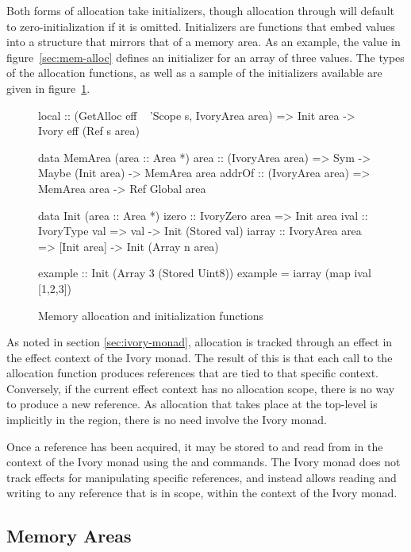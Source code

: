 Both forms of allocation take initializers, though  allocation
through  will default to zero-initialization if it is omitted.
Initializers are functions that embed values into a structure that mirrors that
of a memory area.  As an example, the  value in
figure~\ref{sec:mem-alloc} defines an initializer for an array of three
 values.  The types of the allocation functions, as well as a sample
of the initializers available are given in figure~\ref{fig:mem-alloc}.

\begin{figure}
\begin{code}
local  :: (GetAlloc eff ~ 'Scope s, IvoryArea area)
       => Init area -> Ivory eff (Ref s area)

data MemArea (area :: Area *)
area   :: (IvoryArea area)
       => Sym -> Maybe (Init area) -> MemArea area
addrOf :: (IvoryArea area)
       => MemArea area -> Ref Global area

data Init (area :: Area *)
izero  :: IvoryZero area => Init area
ival   :: IvoryType val  => val -> Init (Stored val)
iarray :: IvoryArea area
       => [Init area] -> Init (Array n area)

example :: Init (Array 3 (Stored Uint8))
example  = iarray (map ival [1,2,3])
\end{code}
\caption{Memory allocation and initialization functions}
\label{fig:mem-alloc}
\end{figure}

As noted in section \ref{sec:ivory-monad}, allocation is tracked through an
effect in the effect context of the Ivory monad.  The result of this is that
each call to the  allocation function produces references that are
tied to that specific context.  Conversely, if the current effect context has
no allocation scope, there is no way to produce a new reference.  As allocation
that takes place at the top-level is implicitly in the  region, there
is no need involve the Ivory monad.

Once a reference has been acquired, it may be stored to and read from in the
context of the Ivory monad using the  and  commands.  The
Ivory monad does not track effects for manipulating specific references, and
instead allows reading and writing to any reference that is in scope, within the
context of the Ivory monad.

\subsection{Memory Areas}
\label{sec:area}

